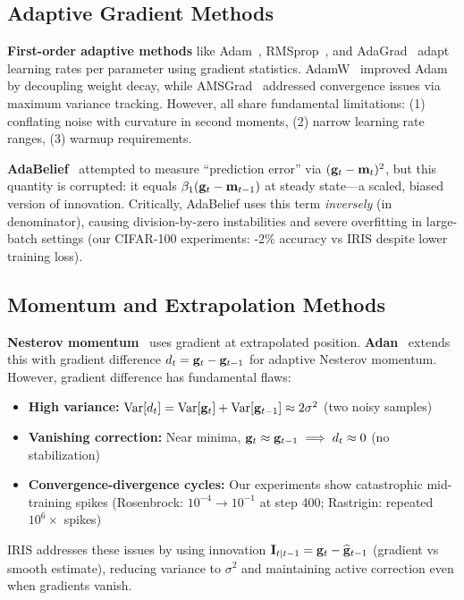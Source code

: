 \subsection{Adaptive Gradient Methods}

\textbf{First-order adaptive methods} like Adam~\citep{kingma2015adam}, RMSprop~\citep{tieleman2012rmsprop}, and AdaGrad~\citep{duchi2011adagrad} adapt learning rates per parameter using gradient statistics. AdamW~\citep{loshchilov2019adamw} improved Adam by decoupling weight decay, while AMSGrad~\citep{reddi2018amsgrad} addressed convergence issues via maximum variance tracking. However, all share fundamental limitations: (1) conflating noise with curvature in second moments, (2) narrow learning rate ranges, (3) warmup requirements.

\textbf{AdaBelief}~\citep{zhuang2020adabelief} attempted to measure ``prediction error'' via $(\mathbf{g}_t - \mathbf{m}_t)^2$, but this quantity is corrupted: it equals $\beta_1(\mathbf{g}_t - \mathbf{m}_{t-1})$ at steady state---a scaled, biased version of innovation. Critically, AdaBelief uses this term \emph{inversely} (in denominator), causing division-by-zero instabilities and severe overfitting in large-batch settings (our CIFAR-100 experiments: -2\% accuracy vs IRIS despite lower training loss).

\subsection{Momentum and Extrapolation Methods}

\textbf{Nesterov momentum}~\citep{nesterov1983method} uses gradient at extrapolated position. \textbf{Adan}~\citep{xie2022adan} extends this with gradient difference $d_t = \mathbf{g}_t - \mathbf{g}_{t-1}$ for adaptive Nesterov momentum. However, gradient difference has fundamental flaws:
\begin{itemize}
    \item \textbf{High variance:} $\operatorname{Var}[d_t] = \operatorname{Var}[\mathbf{g}_t] + \operatorname{Var}[\mathbf{g}_{t-1}] \approx 2\sigma^2$ (two noisy samples)
    \item \textbf{Vanishing correction:} Near minima, $\mathbf{g}_t \approx \mathbf{g}_{t-1} \implies d_t \approx 0$ (no stabilization)
    \item \textbf{Convergence-divergence cycles:} Our experiments show catastrophic mid-training spikes (Rosenbrock: $10^{-4} \to 10^{-1}$ at step 400; Rastrigin: repeated $10^6\times$ spikes)
\end{itemize}

IRIS addresses these issues by using innovation $\mathbf{I}_{t|t-1} = \mathbf{g}_t - \widehat{\mathbf{g}}_{t-1}$ (gradient vs smooth estimate), reducing variance to $\sigma^2$ and maintaining active correction even when gradients vanish.

